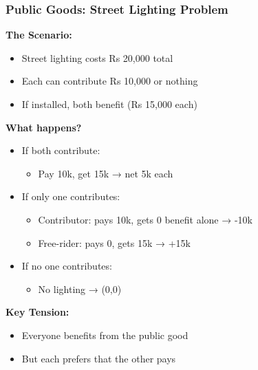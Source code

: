 \begin{frame}[fragile]\frametitle{Public Goods: Street Lighting Problem}

\textbf{The Scenario:}
\begin{itemize}
  \item Street lighting costs Rs 20,000 total
  \item Each can contribute Rs 10,000 or nothing
  \item If installed, both benefit (Rs 15,000 each)
\end{itemize}

\vspace{6pt}

\textbf{What happens?}

\begin{itemize}
  \item If both contribute:
  \begin{itemize}
    \item Pay 10k, get 15k → net 5k each
  \end{itemize}
  
  \item If only one contributes:
  \begin{itemize}
    \item Contributor: pays 10k, gets 0 benefit alone → -10k
    \item Free-rider: pays 0, gets 15k → +15k
  \end{itemize}
  
  \item If no one contributes:
  \begin{itemize}
    \item No lighting → (0,0)
  \end{itemize}
\end{itemize}

\vspace{6pt}

\textbf{Key Tension:}
\begin{itemize}
  \item Everyone benefits from the public good
  \item But each prefers that the other pays
\end{itemize}

\end{frame}

